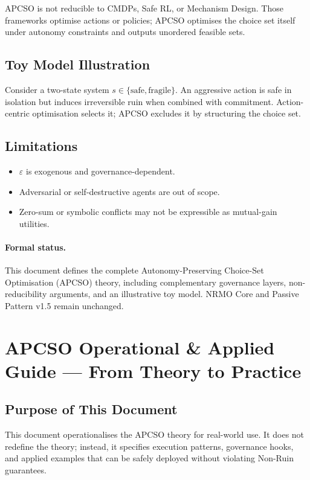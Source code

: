 APCSO is not reducible to CMDPs, Safe RL, or Mechanism Design. Those
frameworks optimise actions or policies; APCSO optimises the choice
set itself under autonomy constraints and outputs unordered feasible
sets.

\subsection{Toy Model Illustration}

Consider a two-state system $s \in \{\mathrm{safe},
\mathrm{fragile}\}$. An aggressive action is safe in isolation but
induces irreversible ruin when combined with commitment.
Action-centric optimisation selects it; APCSO excludes it by
structuring the choice set.

\subsection{Limitations}

\begin{itemize}
\item $\varepsilon$ is exogenous and governance-dependent.
\item Adversarial or self-destructive agents are out of scope.
\item Zero-sum or symbolic conflicts may not be expressible as
mutual-gain utilities.
\end{itemize}

\paragraph{Formal status.}
This document defines the complete Autonomy-Preserving Choice-Set
Optimisation (APCSO) theory, including complementary governance
layers, non-reducibility arguments, and an illustrative toy model.
NRMO Core and Passive Pattern v1.5 remain unchanged.

\section{APCSO Operational \& Applied Guide --- From Theory to
Practice}
\label{sec:apcso-applied-guide}

\subsection{Purpose of This Document}

This document operationalises the APCSO theory for real-world use.
It does not redefine the theory; instead, it specifies execution
patterns, governance hooks, and applied examples that can be safely
deployed without violating Non-Ruin guarantees.

